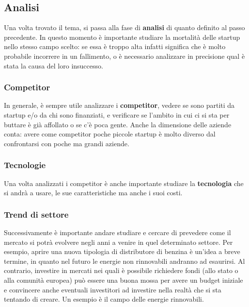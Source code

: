 \subsection{Analisi}
Una volta trovato il tema, si passa alla fase di \textbf{analisi} di quanto
definito al passo precedente. In questo momento è importante studiare la
mortalità delle startup nello stesso campo scelto: se essa è troppo alta
infatti significa che è molto probabile incorrere in un fallimento, o è
necessario analizzare in precisione qual è stata la causa del loro
insuccesso.

\subsubsection{Competitor}
In generale, è sempre utile analizzare i \textbf{competitor}, vedere se sono
partiti da startup e/o da chi sono finanziati, e verificare se l'ambito in cui
ci si sta per buttare è già affollato o se c'è poca gente. Anche la dimensione
delle aziende conta: avere come competitor poche piccole startup è molto
diverso dal confrontarsi con poche ma grandi aziende.

\subsubsection{Tecnologie}
Una volta analizzati i competitor è anche importante studiare la
\textbf{tecnologia} che si andrà a usare, le sue caratteristiche ma anche i
suoi costi.

\subsubsection{Trend di settore}
Successivamente è importante andare studiare e cercare di prevedere come il
mercato si potrà evolvere negli anni a venire in quel determinato settore.
Per esempio, aprire una nuova tipologia di distributore di benzina è un'idea a
breve termine, in quanto nel futuro le energie non rinnovabili andranno ad
esaurirsi. Al contrario, investire in mercati nei quali è possibile richiedere
fondi (allo stato o alla comunità europea) può essere una buona mossa per
avere un budget iniziale e convincere anche eventuali investitori ad
investire nella realtà che si sta tentando di creare. Un esempio è il campo
delle energie rinnovabili.

